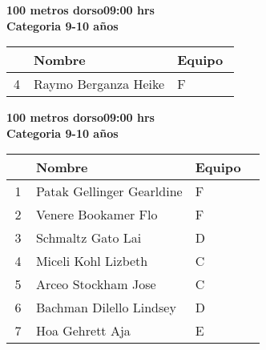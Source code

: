 \begin{minipage}{0.95\linewidth}\vspace{0.5cm} 
\begin{flushleft}
\textbf{
\hspace{-0.15cm}100 metros dorso\hspace{1.5cm}09:00 hrs \\Categoria 9-10 años}\vspace{-0.2cm} 
\end{flushleft}
\begin{tabular}{cp{0.63\linewidth}l}
\hline
& \textbf{Nombre} & \textbf{Equipo} \\ \hline
4 & Raymo Berganza Heike & F \\ 
\end{tabular}
\end{minipage}
\begin{minipage}{0.95\linewidth}\vspace{0.5cm} 
\begin{flushleft}
\textbf{
\hspace{-0.15cm}100 metros dorso\hspace{1.5cm}09:00 hrs \\Categoria 9-10 años}\vspace{-0.2cm} 
\end{flushleft}
\begin{tabular}{cp{0.63\linewidth}l}
\hline
& \textbf{Nombre} & \textbf{Equipo} \\ \hline
1 & Patak Gellinger Gearldine & F \\ 
2 & Venere Bookamer Flo & F \\ 
3 & Schmaltz Gato Lai & D \\ 
4 & Miceli Kohl Lizbeth & C \\ 
5 & Arceo Stockham Jose & C \\ 
6 & Bachman Dilello Lindsey & D \\ 
7 & Hoa Gehrett Aja & E \\ 
\end{tabular}
\end{minipage}

